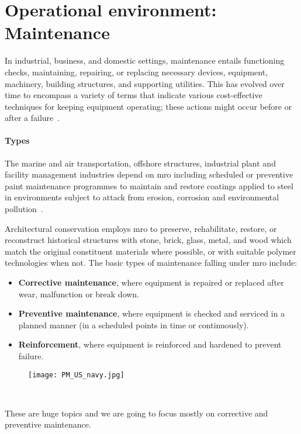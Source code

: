 \section{Operational environment: Maintenance}
In industrial, business, and domestic settings, maintenance entails functioning checks, maintaining, repairing,
or replacing necessary devices, equipment,  machinery, building structures, and supporting utilities.
This has evolved over time to encompass a variety of terms that indicate various cost-effective techniques for keeping equipment operating;
these actions might occur before or after a failure~\cite{Misc:maintenance_2016_efnms}. %

\paragraph{Types}
The marine and air transportation, offshore structures, industrial plant and facility management industries depend on \ac{mro} including scheduled or preventive paint maintenance programmes to maintain and restore coatings applied
to steel in environments subject to attack from erosion, corrosion and environmental pollution~\cite{Report:iso_2018_paints}.

Architectural conservation employs \ac{mro} to preserve, rehabilitate, restore, or reconstruct historical structures with stone,
brick, glass, metal, and wood which match the original constituent materials where possible, or with suitable polymer technologies when not.
The basic types of maintenance falling under \acs{mro} include:
\begin{itemize}
    \item \textbf{Corrective maintenance}, where equipment is repaired or replaced after wear, malfunction or break down.
    \item \textbf{Preventive maintenance}, where equipment is checked and serviced in a planned manner (in a scheduled points in time or continuously).
    \item \textbf{Reinforcement}, where equipment is reinforced and hardened to prevent failure.
\end{itemize}
\begin{figure}[t]
    \centering
    \texttt{[image: PM\_US\_navy.jpg]}
    \caption{~\cite{file:boat_2016_uss}}
    \label{fig:boat_us_navy}
\end{figure}
These are huge topics and we are going to focus mostly on corrective and preventive maintenance.

